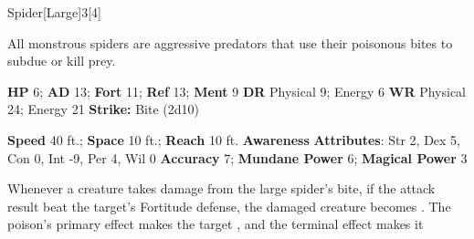   \begin{monsection}{Spider}[Large]{3}[4]
    \vspace{-1em}\vspace{-1em}
    \vspace{0em}

    
    All monstrous spiders are aggressive predators that use their poisonous bites to subdue or kill prey.
  

    \begin{spellcontent}
      \begin{spelltargetinginfo}
        \pari \textbf{HP} 6;
          \textbf{AD} 13;
          \textbf{Fort} 11;
          \textbf{Ref} 13;
          \textbf{Ment} 9
        \pari \textbf{DR} Physical 9; Energy 6
        \pari \textbf{WR} Physical 24; Energy 21
        \pari \textbf{Strike:}
            Bite  (2d10)
      \end{spelltargetinginfo}
    \end{spellcontent}
    \begin{monsterfooter}
      \pari \textbf{Speed} 40 ft.;
        \textbf{Space} 10 ft.;
        \textbf{Reach} 10 ft.
      \pari \textbf{Awareness} 
      \pari \textbf{Attributes}:
        Str 2, Dex 5,
        Con 0, Int -9,
        Per 4, Wil 0
      \pari \textbf{Accuracy} 7;
        \textbf{Mundane Power} 6;
      \textbf{Magical Power} 3
    \end{monsterfooter}
  \end{monsection}
    Whenever a creature takes damage from the large spider's bite,
      if the attack result beat the target's Fortitude defense,
      the damaged creature becomes .
    The poison's primary effect makes the target , and the terminal effect makes it 
  
